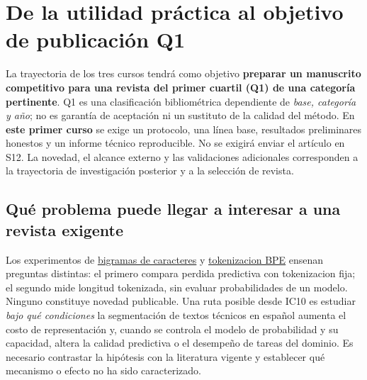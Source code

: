 
\chapter*{De la utilidad práctica al objetivo de publicación Q1}
\label{mod:invest}
\begin{investigacion}
La trayectoria de los tres cursos tendrá como objetivo
\textbf{preparar un manuscrito competitivo para una revista del primer
cuartil (Q1) de una categoría pertinente}. Q1 es una clasificación
bibliométrica dependiente de \emph{base, categoría y año}; no es garantía
de aceptación ni un sustituto de la calidad del método.
En \textbf{este primer curso} se exige un protocolo, una línea base,
resultados preliminares honestos y un informe técnico reproducible.
No se exigirá enviar el artículo en S12. La novedad, el alcance externo y
las validaciones adicionales corresponden a la trayectoria de investigación
posterior y a la selección de revista.
\end{investigacion}
\section*{Qué problema puede llegar a interesar a una revista exigente}
Los experimentos de \hyperref[lab:comp]{bigramas de caracteres}
y \hyperref[lab:ic10]{tokenizacion BPE} ensenan preguntas distintas:
el primero compara perdida predictiva con tokenizacion fija; el segundo
mide longitud tokenizada, sin evaluar probabilidades de un modelo.
Ninguno constituye novedad publicable. Una ruta posible desde IC10 es estudiar
\emph{bajo qué condiciones} la segmentación de textos técnicos en español
aumenta el costo de representación y, cuando se controla el modelo de
probabilidad y su capacidad, altera la calidad predictiva o el desempeño
de tareas del dominio. Es necesario contrastar la hipótesis con la literatura
vigente y establecer qué mecanismo o efecto no ha sido caracterizado.
